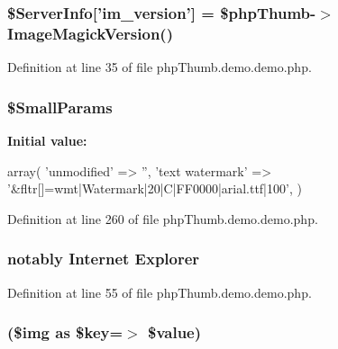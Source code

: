 \hypertarget{php_thumb_8demo_8demo_8php_ad1f321ab5b4c67d74022713a2273b02c}{
\subsubsection[{\$\-Server\-Info}]{\setlength{\rightskip}{0pt plus 5cm}\$\-Server\-Info\mbox{[}'im\-\_\-version'\mbox{]} = \$php\-Thumb-\/$>$\-Image\-Magick\-Version()}}\label{php_thumb_8demo_8demo_8php_ad1f321ab5b4c67d74022713a2273b02c}


\-Definition at line 35 of file php\-Thumb.\-demo.\-demo.\-php.

\hypertarget{php_thumb_8demo_8demo_8php_ae4d36a50f4c87b76d3966a0977fd7b65}{
\subsubsection[{\$\-Small\-Params}]{\setlength{\rightskip}{0pt plus 5cm}\$\-Small\-Params}}\label{php_thumb_8demo_8demo_8php_ae4d36a50f4c87b76d3966a0977fd7b65}
{\bfseries \-Initial value\-:}
\begin{DoxyCode}
 array(
        'unmodified'     => '',
        'text watermark' => '&fltr[]=wmt|Watermark|20|C|FF0000|arial.ttf|100',
)
\end{DoxyCode}


\-Definition at line 260 of file php\-Thumb.\-demo.\-demo.\-php.

\hypertarget{php_thumb_8demo_8demo_8php_a04d914b3024da4b9dd45f0aa60b152f4}{
\subsubsection[{\-Explorer}]{\setlength{\rightskip}{0pt plus 5cm}notably \-Internet {\bf \-Explorer}}}\label{php_thumb_8demo_8demo_8php_a04d914b3024da4b9dd45f0aa60b152f4}


\-Definition at line 55 of file php\-Thumb.\-demo.\-demo.\-php.

\hypertarget{php_thumb_8demo_8demo_8php_a9caa026f841c5a6057418795d37e0ef9}{
\subsubsection[{foreach}]{(\$img as \$key=$>$ \$value)}}\label{php_thumb_8demo_8demo_8php_a9caa026f841c5a6057418795d37e0ef9}


